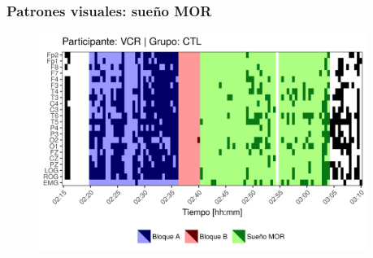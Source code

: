 \documentclass[serif,mathserif,professionalfont]{beamer}
\begin{document}
\begin{frame}\frametitle{Patrones visuales: sueño MOR}
\begin{figure}
\includegraphics[width=0.95\textwidth]
{./img_art_dfa/zoom_siVCR_v2.png}
\end{figure}
\end{frame}
\end{document}
